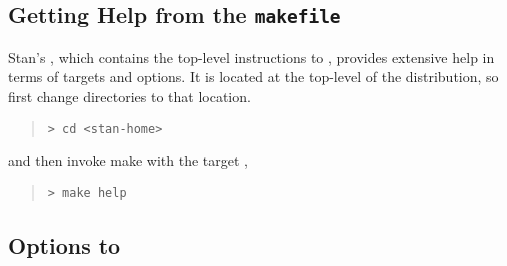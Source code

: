 %


\subsection{Getting Help from the {\tt makefile}}

Stan's , which contains the top-level instructions to
, provides extensive help in terms of targets and options.
It is located at the top-level of the distribution, so first change
directories to that location.
%
\begin{quote}
\begin{Verbatim}[fontshape=sl,fontsize=\small]
> cd <stan-home>
\end{Verbatim}
\end{quote} 
and then invoke make with the target ,

\begin{quote}
\begin{Verbatim}[fontshape=sl,fontsize=\small]
> make help
\end{Verbatim}
\end{quote}


\subsection{Options to }

